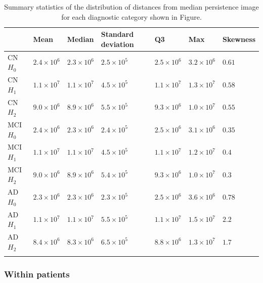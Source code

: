 \documentclass{article}
\begin{document}
\begin{table}
\centering
\begin{tabular}{lllllll}
\toprule
{} &               Mean &             Median & Standard deviation & Q3 &                Max &            Skewness \\
\midrule
CN $H_0$  &  $2.4\times10^{6}$ &  $2.3\times10^{6}$ & $2.5\times10^{5}$ &  $2.5\times10^{6}$ &  $3.2\times10^{6}$ & $0.61$ \\
CN $H_1$  &  $1.1\times10^{7}$ &  $1.1\times10^{7}$ & $4.5\times10^{5}$ &  $1.1\times10^{7}$ &  $1.3\times10^{7}$ & $0.58$ \\
CN $H_2$  &  $9.0\times10^{6}$ &  $8.9\times10^{6}$ & $5.5\times10^{5}$ &  $9.3\times10^{6}$ &  $1.0\times10^{7}$ & $0.55$ \\
MCI $H_0$ &  $2.4\times10^{6}$ &  $2.3\times10^{6}$ & $2.4\times10^{5}$ &  $2.5\times10^{6}$ &  $3.1\times10^{6}$ & $0.35$ \\
MCI $H_1$ &  $1.1\times10^{7}$ &  $1.1\times10^{7}$ & $4.5\times10^{5}$ &  $1.1\times10^{7}$ &  $1.2\times10^{7}$ & $0.4$ \\
MCI $H_2$ &  $9.0\times10^{6}$ &  $8.9\times10^{6}$ & $5.4\times10^{5}$ &  $9.3\times10^{6}$ &  $1.0\times10^{7}$ & $0.3$ \\
AD $H_0$  &  $2.3\times10^{6}$ &  $2.3\times10^{6}$ & $2.3\times10^{5}$ &  $2.5\times10^{6}$ &  $3.6\times10^{6}$ & $0.78$ \\
AD $H_1$  &  $1.1\times10^{7}$ &  $1.1\times10^{7}$ & $5.5\times10^{5}$ &  $1.1\times10^{7}$ &  $1.5\times10^{7}$ & $2.2$ \\
AD $H_2$  &  $8.4\times10^{6}$ &  $8.3\times10^{6}$ & $6.5\times10^{5}$ &  $8.8\times10^{6}$ &  $1.3\times10^{7}$ & $1.7$ \\
  \bottomrule
  \vspace{1pt}
\end{tabular}
\caption{Summary statistics of the distribution of distances from median persistence image for each diagnostic category shown in Figure.}
\label{tab:stats_median_pi}
\end{table}



\subsubsection{Within patients}
\end{document}
